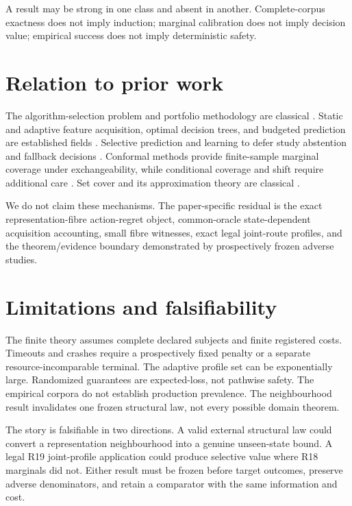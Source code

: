 \documentclass[11pt]{article}
\theoremstyle{definition}
\theoremstyle{remark}
\begin{document}
A result may be strong in one class and absent in another.  Complete-corpus exactness does not imply induction; marginal calibration does not imply decision value; empirical success does not imply deterministic safety.

\section{Relation to prior work}

The algorithm-selection problem and portfolio methodology are classical \citep{rice1976algorithm,xu2008satzilla,hutter2014runtime,bischl2016aslib}.  Static and adaptive feature acquisition, optimal decision trees, and budgeted prediction are established fields \citep{hyafil1976decision,janisch2019classification}.  Selective prediction and learning to defer study abstention and fallback decisions \citep{geifman2017selective,madras2018defer}.  Conformal methods provide finite-sample marginal coverage under exchangeability, while conditional coverage and shift require additional care \citep{vovk2005algorithmic,angelopoulos2024crc}.  Set cover and its approximation theory are classical \citep{karp1972reducibility,chvatal1979greedy}.

We do not claim these mechanisms.  The paper-specific residual is the exact representation-fibre action-regret object, common-oracle state-dependent acquisition accounting, small fibre witnesses, exact legal joint-route profiles, and the theorem/evidence boundary demonstrated by prospectively frozen adverse studies.

\section{Limitations and falsifiability}

The finite theory assumes complete declared subjects and finite registered costs.  Timeouts and crashes require a prospectively fixed penalty or a separate resource-incomparable terminal.  The adaptive profile set can be exponentially large.  Randomized guarantees are expected-loss, not pathwise safety.  The empirical corpora do not establish production prevalence.  The neighbourhood result invalidates one frozen structural law, not every possible domain theorem.

The story is falsifiable in two directions.  A valid external structural law could convert a representation neighbourhood into a genuine unseen-state bound.  A legal R19 joint-profile application could produce selective value where R18 marginals did not.  Either result must be frozen before target outcomes, preserve adverse denominators, and retain a comparator with the same information and cost.
\end{document}
